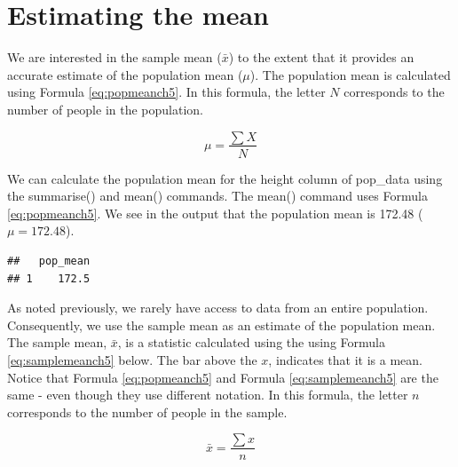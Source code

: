 \documentclass[
]{krantz}
\makeatletter
\newenvironment{Shaded}{\begin{snugshade}}{\end{snugshade}}
\newcommand{\DataTypeTok}[1]{\textcolor[rgb]{0.27,0.27,0.27}{#1}}
\newcommand{\KeywordTok}[1]{\textcolor[rgb]{0.27,0.27,0.27}{\textbf{#1}}}
\newcommand{\NormalTok}[1]{#1}
\newcommand{\OperatorTok}[1]{\textcolor[rgb]{0.43,0.43,0.43}{\textbf{#1}}}
\newcommand{\StringTok}[1]{\textcolor[rgb]{0.5,0.5,0.5}{#1}}
\newenvironment{kframe}{%
\medskip{}
\setlength{\fboxsep}{.8em}
 \def\at@end@of@kframe{}%
 \ifinner\ifhmode%
  \def\at@end@of@kframe{\end{minipage}}%
  \begin{minipage}{\columnwidth}%
 \fi\fi%
 \def\FrameCommand##1{\hskip\@totalleftmargin \hskip-\fboxsep
 \colorbox{shadecolor}{##1}\hskip-\fboxsep
     \hskip-\linewidth \hskip-\@totalleftmargin \hskip\columnwidth}%
 \MakeFramed {\advance\hsize-\width
   \@totalleftmargin\z@ \linewidth\hsize
   \@setminipage}}%
 {\par\unskip\endMakeFramed%
 \at@end@of@kframe}
\renewenvironment{Shaded}{\begin{kframe}}{\end{kframe}}
\makeatother
\begin{document}
\hypertarget{estimating-the-mean}{%
\section{Estimating the mean}\label{estimating-the-mean}}

We are interested in the sample mean (\(\bar{x}\)) to the extent that it provides an accurate estimate of the population mean (\(\mu\)). The population mean is calculated using Formula \eqref{eq:popmeanch5}. In this formula, the letter \(N\) corresponds to the number of people in the population.

\begin{equation} 
\mu = \frac{\sum{X}}{N}
      \label{eq:popmeanch5}
\end{equation}

We can calculate the population mean for the height column of pop\_data using the summarise() and mean() commands. The mean() command uses Formula \eqref{eq:popmeanch5}. We see in the output that the population mean is 172.48 (\(\mu = 172.48\)).

\begin{Shaded}
\end{Shaded}

\begin{verbatim}
##   pop_mean
## 1    172.5
\end{verbatim}

As noted previously, we rarely have access to data from an entire population. Consequently, we use the sample mean as an estimate of the population mean. The sample mean, \(\bar{x}\), is a statistic calculated using the using Formula \eqref{eq:samplemeanch5} below. The bar above the \(x\), indicates that it is a mean. Notice that Formula \eqref{eq:popmeanch5} and Formula \eqref{eq:samplemeanch5} are the same - even though they use different notation. In this formula, the letter \(n\) corresponds to the number of people in the sample.

\begin{equation} 
\bar{x} = \frac{\sum{x}}{n}
      \label{eq:samplemeanch5}
\end{equation}
\end{document}
